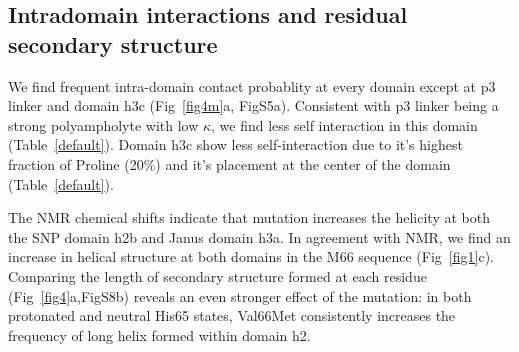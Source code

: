 \documentclass[journal=jacsat,manuscript=article]{achemso}
\begin{document}
\subsection{Intradomain interactions and residual secondary structure}
We find frequent intra-domain contact probablity at every domain except at p3 linker and domain h3c (Fig~\ref{fig4m}a, FigS5a). Consistent with p3 linker being a strong polyampholyte with low $\kappa$, we find less self interaction in this domain (Table~\ref{default}). Domain h3c show less self-interaction due to it's highest fraction of Proline (20\%) and it's placement at the center of the domain (Table~\ref{default}).

The NMR chemical shifts indicate that mutation increases the helicity at both the SNP domain h2b and Janus domain h3a. In agreement with NMR, we find an increase in helical structure at both domains in the M66 sequence (Fig~\ref{fig1}c). Comparing the length of secondary structure formed at each residue (Fig~\ref{fig4}a,FigS8b) reveals an even stronger effect of the mutation: in both protonated and neutral His65 states, Val66Met consistently increases the frequency of long helix formed within domain h2. 
\end{document}
